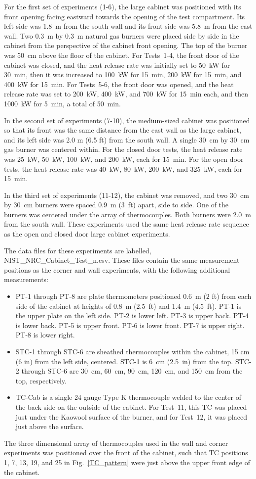 For the first set of experiments (1-6), the large cabinet was positioned with its front opening facing eastward towards the opening of the test compartment. Its left side was 1.8~m from the south wall and its front side was 5.8~m from the east wall. Two 0.3~m by 0.3~m natural gas burners were placed side by side in the cabinet from the perspective of the cabinet front opening. The top of the burner was 50~cm above the floor of the cabinet. For Tests~1-4, the front door of the cabinet was closed, and the heat release rate was initially set to 50~kW for 30~min, then it was increased to 100~kW for 15~min, 200~kW for 15~min, and 400~kW for 15~min. For Tests~5-6, the front door was opened, and the heat release rate was set to 200~kW, 400~kW, and 700~kW for 15~min each, and then 1000~kW for 5~min, a total of 50~min.

In the second set of experiments (7-10), the medium-sized cabinet was positioned so that its front was the same distance from the east wall as the large cabinet, and its left side was 2.0 m (6.5 ft) from the south wall. A single 30~cm by 30~cm gas burner was centered within. For the closed door tests, the heat release rate was 25~kW, 50~kW, 100~kW, and 200~kW, each for 15~min. For the open door tests, the heat release rate was 40~kW, 80~kW, 200~kW, and 325~kW, each for 15~min.

In the third set of experiments (11-12), the cabinet was removed, and two 30~cm by 30~cm burners were spaced 0.9~m (3~ft) apart, side to side. One of the burners was centered under the array of thermocouples. Both burners were 2.0~m from the south wall. These experiments used the same heat release rate sequence as the open and closed door large cabinet experiments.

The data files for these experiments are labelled, {\ct NIST\_NRC\_Cabinet\_Test\_n.csv}. These files contain the same measurement positions as the corner and wall experiments, with the following additional measurements:
\begin{itemize}
\item PT-1 through PT-8 are plate thermometers positioned 0.6~m (2 ft) from each side of the cabinet at heights of 0.8~m (2.5~ft) and 1.4~m (4.5~ft). PT-1 is the upper plate on the left side. PT-2 is lower left. PT-3 is upper back. PT-4 is lower back. PT-5 is upper front. PT-6 is lower front. PT-7 is upper right. PT-8 is lower right.
\item STC-1 through STC-6 are sheathed thermocouples within the cabinet, 15 cm (6 in) from the left side, centered. STC-1 is 6~cm (2.5~in) from the top. STC-2 through STC-6 are 30~cm, 60~cm, 90~cm, 120~cm, and 150~cm from the top, respectively.
\item TC-Cab is a single 24 gauge Type K thermocouple welded to the center of the back side on the outside of the cabinet. For Test~11, this TC was placed just under the Kaowool surface of the burner, and for Test~12, it was placed just above the surface.
\end{itemize}
The three dimensional array of thermocouples used in the wall and corner experiments was positioned over the front of the cabinet, such that TC positions 1, 7, 13, 19, and 25 in Fig.~\ref{TC_pattern} were just above the upper front edge of the cabinet.

